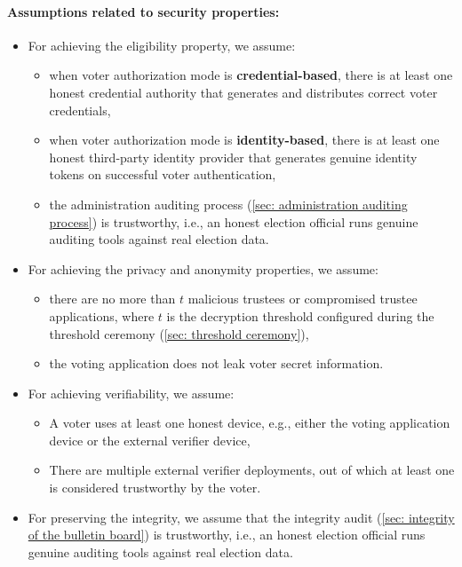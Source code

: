 \paragraph{Assumptions related to security properties:}
\begin{itemize}
    \item For achieving the eligibility property, we assume:
    \begin{itemize}
        \item when voter authorization mode is \textbf{credential-based}, there is at least one honest credential authority that generates and distributes correct voter credentials,
        \item when voter authorization mode is \textbf{identity-based}, there is at least one honest third-party identity provider that generates genuine identity tokens on successful voter authentication,
        \item the administration auditing process (\cref{sec: administration auditing process}) is trustworthy, i.e., an honest election official runs genuine auditing tools against real election data.
    \end{itemize}
    \item For achieving the privacy and anonymity properties, we assume:
    \begin{itemize}
        \item there are no more than $t$ malicious trustees or compromised trustee applications, where $t$ is the decryption threshold configured during the threshold ceremony (\cref{sec: threshold ceremony}),
        \item the voting application does not leak voter secret information.
    \end{itemize}
    \item For achieving verifiability, we assume:
    \begin{itemize}
        \item A voter uses at least one honest device, e.g., either the voting application device or the external verifier device,
        \item There are multiple external verifier deployments, out of which at least one is considered trustworthy by the voter.
    \end{itemize}
    \item For preserving the integrity, we assume that the integrity audit (\cref{sec: integrity of the bulletin board}) is trustworthy, i.e., an honest election official runs genuine auditing tools against real election data.
\end{itemize}
